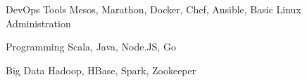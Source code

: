 

\begin{cvskills}

  \cvskill
    {DevOps Tools} %
    {Mesos, Marathon, Docker, Chef, Ansible, Basic Linux Administration} %

  \cvskill
    {Programming} %
    {Scala, Java, Node.JS, Go} %

  \cvskill
    {Big Data} %
    {Hadoop, HBase, Spark, Zookeeper} %

\end{cvskills}
